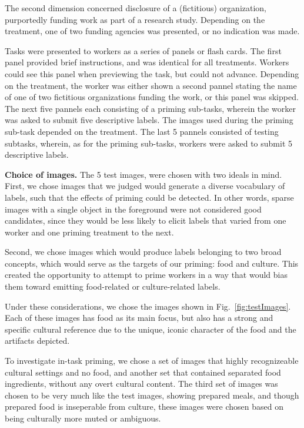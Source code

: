 \documentclass[letterpaper, 11pt, twocolumn]{article}
\begin{document}
The second dimension concerned disclosure of a (fictitious) organization,
purportedly funding work as part of a research study.  Depending on the 
treatment, one of two funding agencies was presented, or no indication was 
made.

Tasks were presented to workers as a series of panels or flash cards.  The
first panel provided brief instructions, and was identical for all treatments.
Workers could see this panel when previewing the task, but could not advance.
Depending on the treatment, the worker was either shown a second pannel 
stating the name of 
one of two fictitious organizations funding the work, or this panel was 
skipped.  The next five pannels each consisting of a priming sub-tasks, 
wherein the worker was asked to submit five descriptive labels.  The images
used during the priming sub-task depended on the treatment.  The last 5 pannels
consisted of testing subtasks, wherein, as for the priming sub-tasks, workers
were asked to submit 5 descriptive labels.

\textbf{Choice of images.}
The 5 test images, were chosen with two ideals in mind.  
First, we chose images that we judged would generate a diverse vocabulary of 
labels, such that the effects of priming could be detected.  In other words,
sparse images with a single object in the foreground were not considered good 
candidates, since they would be less likely to elicit labels that varied from 
one worker and one priming treatment to the next.

Second, we chose images which would produce labels belonging to two broad
concepts, which would serve as the targets of our priming: food and culture.  
This created the opportunity to attempt to prime workers in a way that would
bias them toward emitting food-related or culture-related labels.

Under these considerations, we chose the images shown in 
Fig.~\ref{fig:testImages}.  Each of these images has food as its main focus,
but also has a strong and specific cultural reference due to the unique, 
iconic character of the food and the artifacts depicted.

To investigate in-task priming, we chose a set of images that highly
recognizeable cultural settings and no food, and another set that contained
separated food ingredients, without any overt cultural content.  The third
set of images was chosen to be very much like the test images, showing prepared
meals, and though prepared food is inseperable from culture, these images
were chosen based on being culturally more muted or ambiguous. 
\end{document}
